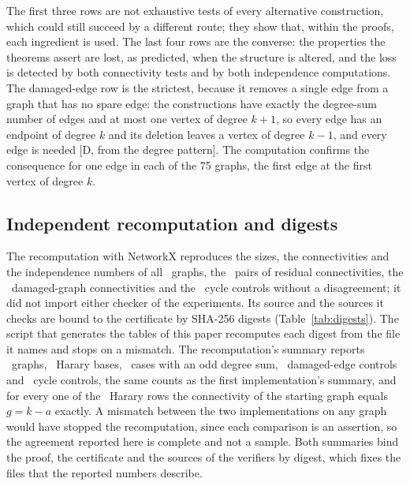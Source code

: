 The first three rows are not exhaustive tests of every alternative construction, which could still succeed by a different route; they show that, within the proofs, each ingredient is used.
The last four rows are the converse: the properties the theorems assert are lost, as predicted, when the structure is altered, and the loss is detected by both connectivity tests and by both independence computations.
The damaged-edge row is the strictest, because it removes a single edge from a graph that has no spare edge: the constructions have exactly the degree-sum number of edges and at most one vertex of degree $k+1$, so every edge has an endpoint of degree $k$ and its deletion leaves a vertex of degree $k-1$, and every edge is needed [D, from the degree pattern].
The computation confirms the consequence for one edge in each of the 75 graphs, the first edge at the first vertex of degree $k$.

\subsection{Independent recomputation and digests}\label{sec:res-audit}

The recomputation with NetworkX \cite{NetworkX} reproduces the sizes, the connectivities and the independence numbers of all \NGraphs\ graphs, the \NHarary\ pairs of residual connectivities, the \NDamaged\ damaged-graph connectivities and the \NCycleControls\ cycle controls without a disagreement; it did not import either checker of the experiments.
Its source and the sources it checks are bound to the certificate by SHA-256 digests (Table~\ref{tab:digests}).
The script that generates the tables of this paper recomputes each digest from the file it names and stops on a mismatch.
The recomputation's summary reports \NGraphs\ graphs, \NHarary\ Harary bases, \NOdd\ cases with an odd degree sum, \NDamaged\ damaged-edge controls and \NCycleControls\ cycle controls, the same counts as the first implementation's summary, and for every one of the \NHarary\ Harary rows the connectivity of the starting graph equals $g=k-a$ exactly.
A mismatch between the two implementations on any graph would have stopped the recomputation, since each comparison is an assertion, so the agreement reported here is complete and not a sample.
Both summaries bind the proof, the certificate and the sources of the verifiers by digest, which fixes the files that the reported numbers describe.


